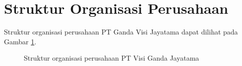\section{Struktur Organisasi Perusahaan}



Struktur organisasi perusahaan PT Ganda Visi Jayatama dapat dilihat pada Gambar \ref{fig:struktur_organisasi}.
\begin{figure}
	\centering
	\caption{Struktur organisasi perusahaan PT Visi Ganda Jayatama }
	\vspace{0em}
	\label{fig:struktur_organisasi}
\end{figure}

